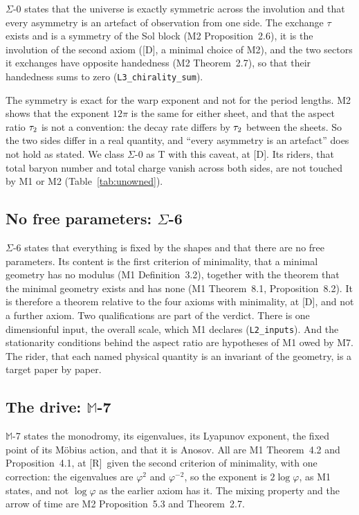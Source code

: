 \documentclass[11pt,a4paper]{article}
\theoremstyle{plain}
\theoremstyle{definition}
\theoremstyle{remark}
\newcommand{\rigR}{[\textup{R}]}
\newcommand{\rigD}{[\textup{D}]}
\newcommand{\Max}[1]{$\mathbb{M}$-#1}
\newcommand{\Sig}[1]{$\Sigma$-#1}
\begin{document}
\Sig{0} states that the universe is exactly symmetric across the involution and that every asymmetry is an artefact of observation from one side. The exchange $\tau$ exists and is a symmetry of the Sol block (M2 Proposition~2.6), it is the involution of the second axiom (\rigD, a minimal choice of M2), and the two sectors it exchanges have opposite handedness (M2 Theorem~2.7), so that their handedness sums to zero (\texttt{L3\_chirality\_sum}).

The symmetry is exact for the warp exponent and not for the period lengths. M2 shows that the exponent $12\pi$ is the same for either sheet, and that the aspect ratio $\tau_2$ is not a convention: the decay rate differs by $\tau_2$ between the sheets. So the two sides differ in a real quantity, and ``every asymmetry is an artefact'' does not hold as stated. We class \Sig{0} as T with this caveat, at \rigD. Its riders, that total baryon number and total charge vanish across both sides, are not touched by M1 or M2 (Table~\ref{tab:unowned}).

\subsection{No free parameters: \texorpdfstring{$\Sigma$}{Sigma}-6}\label{sec:sigma6}

\Sig{6} states that everything is fixed by the shapes and that there are no free parameters. Its content is the first criterion of minimality, that a minimal geometry has no modulus (M1 Definition~3.2), together with the theorem that the minimal geometry exists and has none (M1 Theorem~8.1, Proposition~8.2). It is therefore a theorem relative to the four axioms with minimality, at \rigD, and not a further axiom. Two qualifications are part of the verdict. There is one dimensionful input, the overall scale, which M1 declares (\texttt{L2\_inputs}). And the stationarity conditions behind the aspect ratio are hypotheses of M1 owed by M7. The rider, that each named physical quantity is an invariant of the geometry, is a target paper by paper.

\subsection{The drive: \texorpdfstring{$\mathbb{M}$}{M}-7}\label{sec:m7}

\Max{7} states the monodromy, its eigenvalues, its Lyapunov exponent, the fixed point of its M\"obius action, and that it is Anosov. All are M1 Theorem~4.2 and Proposition~4.1, at \rigR\ given the second criterion of minimality, with one correction: the eigenvalues are $\varphi^{2}$ and $\varphi^{-2}$, so the exponent is $2\log\varphi$, as M1 states, and not $\log\varphi$ as the earlier axiom has it. The mixing property and the arrow of time are M2 Proposition~5.3 and Theorem~2.7.
\end{document}
